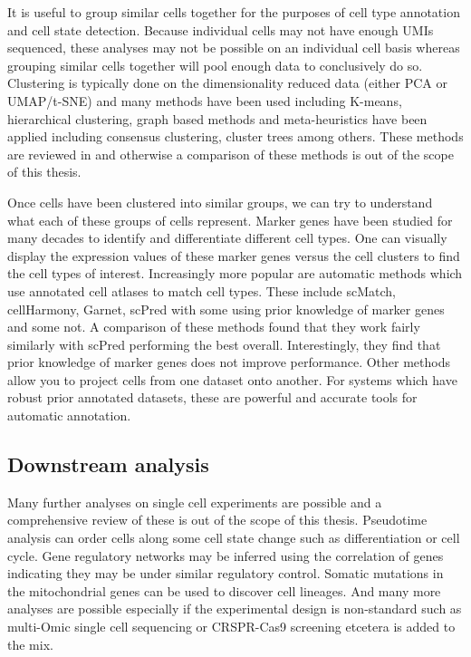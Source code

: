 \par{
It is useful to group similar cells together for the purposes of cell type annotation and cell state detection. Because individual cells may not have enough UMIs sequenced, these analyses may not be possible on an individual cell basis whereas grouping similar cells together will pool enough data to conclusively do so. Clustering is typically done on the dimensionality reduced data (either PCA or UMAP/t-SNE) and many methods have been used including K-means, hierarchical clustering, graph based methods and meta-heuristics have been applied including consensus clustering, cluster trees among others\cite{scclustreview}\cite{subpop}\cite{sc3}\cite{clustree}. These methods are reviewed in \cite{scclustreview} and otherwise a comparison of these methods is out of the scope of this thesis.
} 

\par{
Once cells have been clustered into similar groups, we can try to understand what each of these groups of cells represent. Marker genes have been studied for many decades to identify and differentiate different cell types. One can visually display the expression values of these marker genes versus the cell clusters to find the cell types of interest. Increasingly more popular are automatic methods which use annotated cell atlases to match cell types. These include scMatch\cite{scMatch}, cellHarmony\cite{cellHarmony}, Garnet\cite{Garnet}, scPred\cite{scPred} with some using prior knowledge of marker genes and some not. A comparison of these methods found that they work fairly similarly with scPred performing the best overall. Interestingly, they find that prior knowledge of marker genes does not improve performance. Other methods allow you to project cells from one dataset onto another\cite{scmap}. For systems which have robust prior annotated datasets, these are powerful and accurate tools for automatic annotation.
}



\subsection{Downstream analysis}
\par{
Many further analyses on single cell experiments are possible and a comprehensive review of these is out of the scope of this thesis. Pseudotime analysis can order cells along some cell state change such as differentiation or cell cycle\cite{pseudotime}\cite{scHOT}. Gene regulatory networks may be inferred using the correlation of genes indicating they may be under similar regulatory control\cite{scenic}. Somatic mutations in the mitochondrial genes can be used to discover cell lineages\cite{lineage}. And many more analyses are possible especially if the experimental design is non-standard such as multi-Omic single cell sequencing or CRSPR-Cas9 screening\cite{perturb} etcetera is added to the mix.
}

